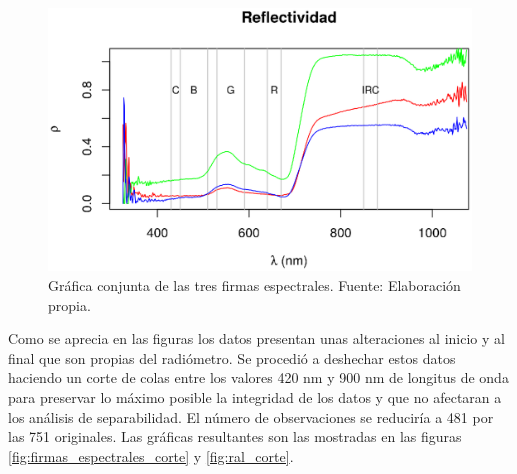\begin{figure}
	\centering
	\includegraphics[width=0.8\linewidth]{./Imagenes/ral.eps}
	\caption[Firmas espectrales de las tres especies]{Gráfica conjunta de las tres firmas espectrales. Fuente: Elaboración propia.}
	\label{fig:ral}
\end{figure}

Como se aprecia en las figuras los datos presentan unas alteraciones al inicio y al final que son propias del radiómetro. Se procedió a deshechar estos datos haciendo un corte de colas entre los valores 420 nm y 900 nm de longitus de onda para preservar lo máximo posible la integridad de los datos y que no afectaran a los análisis de separabilidad. El número de observaciones se reduciría a 481 por las 751 originales. Las gráficas resultantes son las mostradas en las figuras \ref{fig:firmas_espectrales_corte} y \ref{fig:ral_corte}.

